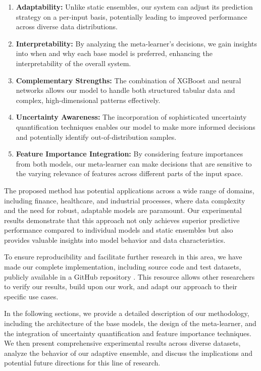 \documentclass[10pt,journal,compsoc]{IEEEtran}
\begin{document}
\begin{enumerate}
    \item \textbf{Adaptability:} Unlike static ensembles, our system can adjust its prediction strategy on a per-input basis, potentially leading to improved performance across diverse data distributions.
    \item \textbf{Interpretability:} By analyzing the meta-learner's decisions, we gain insights into when and why each base model is preferred, enhancing the interpretability of the overall system.
    \item \textbf{Complementary Strengths:} The combination of XGBoost and neural networks allows our model to handle both structured tabular data and complex, high-dimensional patterns effectively.
    \item \textbf{Uncertainty Awareness:} The incorporation of sophisticated uncertainty quantification techniques enables our model to make more informed decisions and potentially identify out-of-distribution samples.
    \item \textbf{Feature Importance Integration:} By considering feature importances from both models, our meta-learner can make decisions that are sensitive to the varying relevance of features across different parts of the input space.
\end{enumerate}

The proposed method has potential applications across a wide range of domains, including finance, healthcare, and industrial processes, where data complexity and the need for robust, adaptable models are paramount. Our experimental results demonstrate that this approach not only achieves superior predictive performance compared to individual models and static ensembles but also provides valuable insights into model behavior and data characteristics.

To ensure reproducibility and facilitate further research in this area, we have made our complete implementation, including source code and test datasets, publicly available in a GitHub repository \cite{github_repo}. This resource allows other researchers to verify our results, build upon our work, and adapt our approach to their specific use cases.

In the following sections, we provide a detailed description of our methodology, including the architecture of the base models, the design of the meta-learner, and the integration of uncertainty quantification and feature importance techniques. We then present comprehensive experimental results across diverse datasets, analyze the behavior of our adaptive ensemble, and discuss the implications and potential future directions for this line of research.
\end{document}
